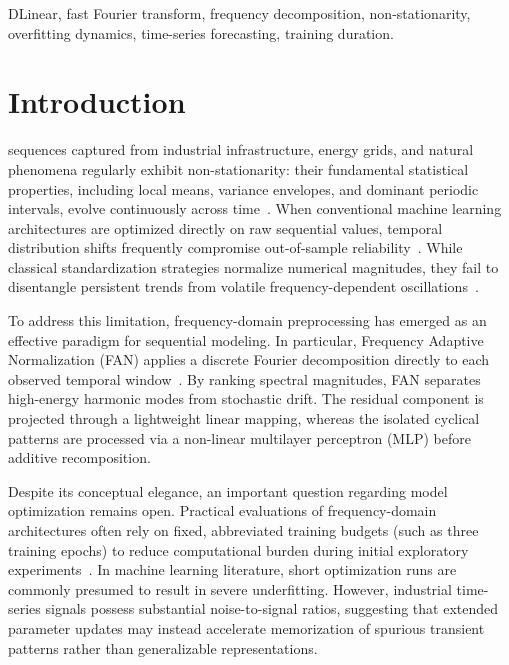 \documentclass[journal]{IEEEtran}
\begin{document}
\begin{IEEEkeywords}
DLinear, fast Fourier transform, frequency decomposition, non-stationarity, overfitting dynamics, time-series forecasting, training duration.
\end{IEEEkeywords}

\IEEEpeerreviewmaketitle

\section{Introduction}

 sequences captured from industrial infrastructure, energy grids, and natural phenomena regularly exhibit non-stationarity: their fundamental statistical properties, including local means, variance envelopes, and dominant periodic intervals, evolve continuously across time~\cite{zhou2021informer}. When conventional machine learning architectures are optimized directly on raw sequential values, temporal distribution shifts frequently compromise out-of-sample reliability~\cite{wu2023timesnet}. While classical standardization strategies normalize numerical magnitudes, they fail to disentangle persistent trends from volatile frequency-dependent oscillations~\cite{ye2024fan}.

To address this limitation, frequency-domain preprocessing has emerged as an effective paradigm for sequential modeling. In particular, Frequency Adaptive Normalization (FAN) applies a discrete Fourier decomposition directly to each observed temporal window~\cite{ye2024fan}. By ranking spectral magnitudes, FAN separates high-energy harmonic modes from stochastic drift. The residual component is projected through a lightweight linear mapping, whereas the isolated cyclical patterns are processed via a non-linear multilayer perceptron (MLP) before additive recomposition.

Despite its conceptual elegance, an important question regarding model optimization remains open. Practical evaluations of frequency-domain architectures often rely on fixed, abbreviated training budgets (such as three training epochs) to reduce computational burden during initial exploratory experiments~\cite{fancode}. In machine learning literature, short optimization runs are commonly presumed to result in severe underfitting. However, industrial time-series signals possess substantial noise-to-signal ratios, suggesting that extended parameter updates may instead accelerate memorization of spurious transient patterns rather than generalizable representations.
\end{document}
